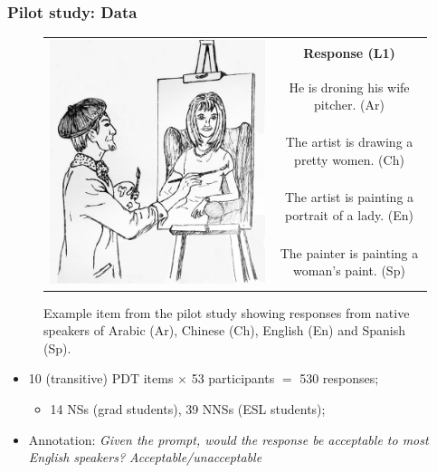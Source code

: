 \documentclass[handout,xcolor={dvipsnames}]{beamer}
\begin{document}
\begin{frame}
\frametitle{Pilot study: Data}
\begin{small}
\begin{figure}[htb!]
\begin{center}
\bgroup
\def\arraystretch{1.45}
\begin{tabular}{|c|c|}
\hline
\multirow{5}{*}{\includegraphics[trim=0 50 0 20,clip,width=0.28\columnwidth]{figures/exampleprompt.jpg}} &
\textbf{Response (L1)} \\
\cline{2-2}
& He is droning his wife pitcher. (Ar) \\
\cline{2-2}
& The artist is drawing a pretty women. (Ch) \\
\cline{2-2}
& The artist is painting a portrait of a lady. (En) \\
\cline{2-2}
& The painter is painting a woman's paint. (Sp) \\
\hline
\end{tabular}
\egroup
\end{center}
\caption{Example item from the pilot study showing responses from native speakers of Arabic (Ar), Chinese (Ch), English (En) and Spanish (Sp).}
\label{fig:example-picture}
\end{figure}
\end{small}
\vspace{-1em}
\pause
\begin{itemize}
\item 10 (transitive) PDT items $\times$ 53 participants $=$ 530 responses;
\pause
\begin{itemize}
\item 14 NSs (grad students), 39 NNSs (ESL students);
\end{itemize}
\pause
\item Annotation: \textit{Given the prompt, would the response be acceptable to most English speakers? Acceptable/unacceptable}
\begin{itemize}

\end{itemize}
\end{itemize}
\end{frame}
\end{document}
